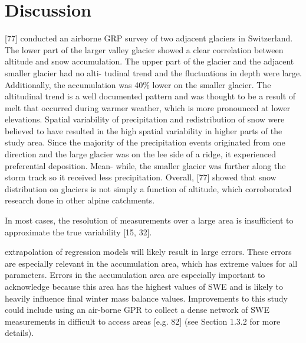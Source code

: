 \documentclass[twoside,twocolumn]{article}
\begin{document}
\section{Discussion}
[77] conducted an airborne GRP survey of two adjacent glaciers in Switzerland. The
lower part of the larger valley glacier showed a clear correlation between altitude and snow
accumulation. The upper part of the glacier and the adjacent smaller glacier had no alti-
tudinal trend and the fluctuations in depth were large. Additionally, the accumulation was
40\% lower on the smaller glacier. The altitudinal trend is a well documented pattern and
was thought to be a result of melt that occurred during warmer weather, which is more
pronounced at lower elevations. Spatial variability of precipitation and redistribution of
snow were believed to have resulted in the high spatial variability in higher parts of the
study area. Since the majority of the precipitation events originated from one direction and
the large glacier was on the lee side of a ridge, it experienced preferential deposition. Mean-
while, the smaller glacier was further along the storm track so it received less precipitation.
Overall, [77] showed that snow distribution on glaciers is not simply a function of altitude,
which corroborated research done in other alpine catchments.

 In most cases, the resolution of measurements over a large area is insufficient to
approximate the true variability [15, 32].


extrapolation of regression models will
likely result in large errors. These errors are especially relevant in the accumulation area,
which has extreme values for all parameters. Errors in the accumulation area are especially
important to acknowledge because this area has the highest values of SWE and is likely to
heavily influence final winter mass balance values. Improvements to this study could include
using an air-borne GPR to collect a dense network of SWE measurements in difficult to
access areas [e.g. 82] (see Section 1.3.2 for more details).




\end{document}
